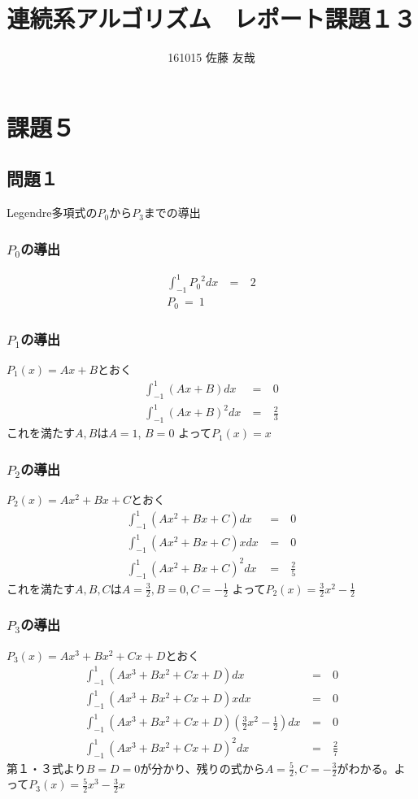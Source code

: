 \documentclass[16pt,a4paper]{jsarticle}
\title{連続系アルゴリズム　レポート課題１３}
\author{161015 佐藤 友哉}
\date{}
\begin{document}
\maketitle
\section*{課題５}
\subsection*{問題１}
Legendre多項式の$P_0$から$P_3$までの導出
\subsubsection*{$P_0$の導出}
\begin{eqnarray}
  \int_{-1}^{1} {P_0}^2 dx\ &=&\ 2 \nonumber \\
  P_0\ =\ 1 \nonumber
\end{eqnarray}
\subsubsection*{$P_1$の導出}
$P_1(x) = Ax + B$とおく
\begin{eqnarray}
  \int_{-1}^{1} (Ax + B) dx\ &=&\ 0 \nonumber \\
  \int_{-1}^{1} (Ax + B)^2 dx\ &=&\ \frac{2}{3} \nonumber
\end{eqnarray}
これを満たす$A,B$は$A = 1$, $B = 0$
よって$P_1(x) = x$
\subsubsection*{$P_2$の導出}
$P_2(x) = Ax^2 + Bx + C$とおく
\begin{eqnarray}
  \int_{-1}^{1} (Ax^2 + Bx + C) dx\ &=&\ 0 \nonumber \\
  \int_{-1}^{1} (Ax^2 + Bx + C)x dx\ &=&\ 0 \nonumber \\
  \int_{-1}^{1} (Ax^2 + Bx + C)^2 dx\ &=&\ \frac{2}{5} \nonumber
\end{eqnarray}
これを満たす$A,B,C$は$A = \frac{3}{2}, B = 0, C = - \frac{1}{2}$
よって$P_2(x) = \frac{3}{2} x^2 - \frac{1}{2}$
\subsubsection*{$P_3$の導出}
$P_3(x) = Ax^3 + Bx^2 + Cx + D$とおく
\begin{eqnarray}
  \int_{-1}^{1} (Ax^3 + Bx^2 + Cx + D) dx\ &=&\ 0 \nonumber \\
  \int_{-1}^{1} (Ax^3 + Bx^2 + Cx + D)x dx\ &=&\ 0 \nonumber \\
  \int_{-1}^{1} (Ax^3 + Bx^2 + Cx + D)(\frac{3}{2}x^2 - \frac{1}{2}) dx\ &=&\ 0 \nonumber \\
  \int_{-1}^{1} (Ax^3 + Bx^2 + Cx + D)^2 dx\ &=&\ \frac{2}{7} \nonumber
\end{eqnarray}
第１・３式より$B = D = 0$が分かり、残りの式から$A = \frac{5}{2}, C = -\frac{3}{2}$がわかる。よって$P_3(x) = \frac{5}{2}x^3 - \frac{3}{2}x$
\end{document}
